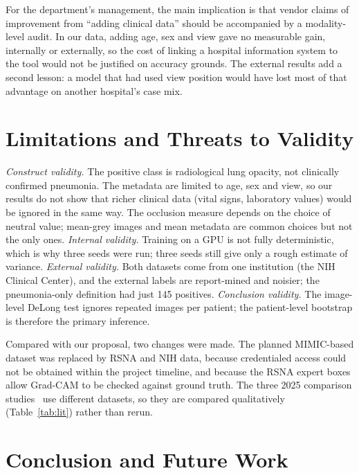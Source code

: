 \documentclass[conference]{IEEEtran}
\begin{document}
For the department's management, the main implication is that vendor claims of improvement from ``adding clinical data'' should be accompanied by a modality-level audit. In our data, adding age, sex and view gave no measurable gain, internally or externally, so the cost of linking a hospital information system to the tool would not be justified on accuracy grounds. The external results add a second lesson: a model that had used view position would have lost most of that advantage on another hospital's case mix.

\section{Limitations and Threats to Validity}
\label{sec:limits}

\textit{Construct validity.} The positive class is radiological lung opacity, not clinically confirmed pneumonia. The metadata are limited to age, sex and view, so our results do not show that richer clinical data (vital signs, laboratory values) would be ignored in the same way. The occlusion measure depends on the choice of neutral value; mean-grey images and mean metadata are common choices but not the only ones. \textit{Internal validity.} Training on a GPU is not fully deterministic, which is why three seeds were run; three seeds still give only a rough estimate of variance. \textit{External validity.} Both datasets come from one institution (the NIH Clinical Center), and the external labels are report-mined and noisier; the pneumonia-only definition had just 145 positives. \textit{Conclusion validity.} The image-level DeLong test ignores repeated images per patient; the patient-level bootstrap is therefore the primary inference.

Compared with our proposal, two changes were made. The planned MIMIC-based dataset was replaced by RSNA and NIH data, because credentialed access could not be obtained within the project timeline, and because the RSNA expert boxes allow Grad-CAM to be checked against ground truth. The three 2025 comparison studies~\cite{kim2025layerwise,truong2025multimodal,gapp2025modality} use different datasets, so they are compared qualitatively (Table~\ref{tab:lit}) rather than rerun.

\section{Conclusion and Future Work}
\label{sec:concl}
\end{document}
